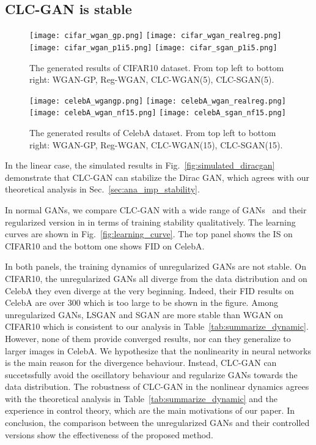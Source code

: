 \documentclass{article}
\newcommand{\fig}[1]{Fig.~\ref{fig:#1}}
\newcommand{\tabl}[1]{Table~\ref{tab:#1}}
\newcommand{\secref}[1]{Sec.~\ref{sec:#1}} \usepackage{wrapfig}
\theoremstyle{definition}
\begin{document}
\subsection{CLC-GAN is stable}
\label{sec:stability_improvement}

\begin{figure}
	\centering
	\texttt{[image: cifar\_wgan\_gp.png]}
	\texttt{[image: cifar\_wgan\_realreg.png]}
	\texttt{[image: cifar\_wgan\_p1i5.png]}
	\texttt{[image: cifar\_sgan\_p1i5.png]}
	\caption{The generated results of CIFAR10 dataset. From top left to bottom right: WGAN-GP, Reg-WGAN, CLC-WGAN(5), CLC-SGAN(5).}
\label{fig:cifar_generation}
\end{figure}

\begin{figure}[t]
	\centering
	\texttt{[image: celebA\_wgangp.png]}
	\texttt{[image: celebA\_wgan\_realreg.png]}
	\texttt{[image: celebA\_wgan\_nf15.png]}
	\texttt{[image: celebA\_sgan\_nf15.png]}
\caption{The generated results of CelebA dataset. From top left to bottom right: WGAN-GP, Reg-WGAN, CLC-WGAN(15), CLC-SGAN(15).}
\label{fig:celeba_generation}
\end{figure}

In the linear case, the simulated results in \fig{simulated_diracgan} demonstrate that CLC-GAN can stabilize the Dirac GAN, which agrees with our theoretical analysis in \secref{ana_imp_stability}. 

In normal GANs, we compare CLC-GAN with a wide range of GANs~\cite{arjovsky2017wasserstein,goodfellow2014generative,mao2017least,miyato2018spectral} and their regularized version in \cite{mescheder2018training} in terms of training stability qualitatively.
The learning curves are shown in \fig{learning_curve}. The top panel shows the IS on CIFAR10 and the bottom one shows FID on CelebA.

In both panels, the training dynamics of unregularized GANs are not stable. On CIFAR10, the unregularized GANs all diverge from the data distribution and on CelebA they even diverge at the very beginning.
Indeed, their FID results on CelebA are over $300$ which is too large to be shown in the figure. 
Among unregularized GANs, LSGAN and SGAN are more stable than WGAN on CIFAR10 which is consistent to our analysis in \tabl{summarize_dynamic}.
However, none of them provide converged results, nor can they generalize to larger images in CelebA.
We hypothesize that the nonlinearity in neural networks is the main reason for the divergence behaviour.
Instead, CLC-GAN can succetssfully avoid the oscillatory behaviour and regularize GANs towards the data distribution. 
The robustness of CLC-GAN in the nonlinear dynamics agrees with the theoretical analysis in \tabl{summarize_dynamic} and the experience in control theory, which are the main motivations of our paper.
In conclusion, the comparison between the unregularized GANs and their controlled versions show the effectiveness of the proposed method.
\end{document}
